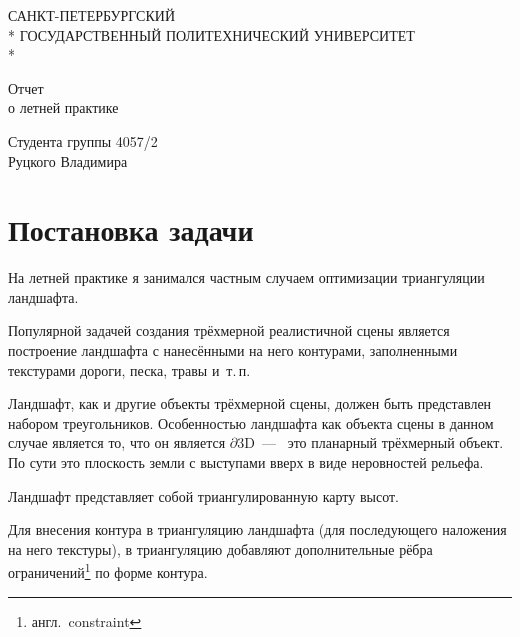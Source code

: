\documentclass[a4paper,10pt,titlepage]{report}
\begin{document}
\begin{titlepage}
\newpage

\begin{center}
САНКТ-ПЕТЕРБУРГСКИЙ \\*
ГОСУДАРСТВЕННЫЙ ПОЛИТЕХНИЧЕСКИЙ УНИВЕРСИТЕТ \\*
\hrulefill
\end{center}


\vspace{8em}

\begin{center}
\Large Отчет \\ о летней практике
\end{center}

\vspace{8.5em}

\begin{center}
Студента группы 4057/2 \\ Руцкого Владимира
\end{center}

\vspace{\fill}

\end{titlepage}
\pagebreak


\section*{Постановка задачи}
На летней практике я занимался частным случаем оптимизации триангуляции ландшафта.

Популярной задачей создания трёхмерной реалистичной сцены является построение ландшафта 
с нанесёнными на него контурами, заполненными текстурами дороги, песка, травы и~т.\,п.

Ландшафт, как и другие объекты трёхмерной сцены, должен быть представлен набором треугольников.
Особенностью ландшафта как объекта сцены в данном случае является то, что он является $\partial 3\mathrm{D}$~---~
это планарный трёхмерный объект.
По сути это плоскость земли с выступами вверх в виде неровностей рельефа.

Ландшафт представляет собой триангулированную карту высот.

Для внесения контура в триангуляцию ландшафта (для последующего наложения на него текстуры),
в триангуляцию добавляют дополнительные рёбра ограничений\footnote{англ.~constraint} по форме контура.
\end{document}

